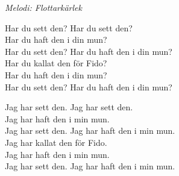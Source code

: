 {\footnotesize\textit{Melodi: Flottarkärlek}}\par
\vspace{10pt}
Har du sett den? Har du sett den?\\
Har du haft den i din mun?\\
Har du sett den? Har du haft den i din mun?\\
Har du kallat den för Fido?\\
Har du haft den i din mun?\\
Har du sett den? Har du haft den i din mun?\par
\vspace{10pt}
Jag har sett den. Jag har sett den.\\
Jag har haft den i min mun.\\
Jag har sett den. Jag har haft den i min mun.\\
Jag har kallat den för Fido.\\
Jag har haft den i min mun.\\
Jag har sett den. Jag har haft den i min mun.
